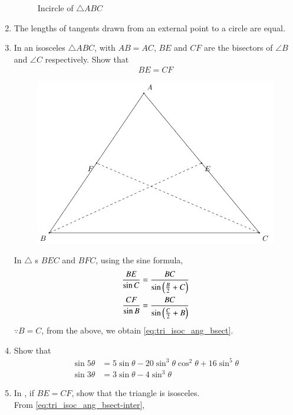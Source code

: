\begin{enumerate}[label=\thesubsection.\arabic*.,ref=\thesubsection.\theenumi]
\begin{figure}[!ht]
\begin{center}
	\end{center}
	\caption{Incircle of $\triangle ABC$}
	\label{fig:tri_icircle}	
\end{figure}
\item The lengths of tangents drawn from an external point to a circle are equal.
\item In an isosceles $\triangle ABC$, with $AB = AC$, $BE$ and $CF$ are the bisectors of $\angle B$ and $\angle C$ respectively.   Show that 
\begin{align}
BE = CF
	\label{eq:tri_isoc_ang_bsect}
\end{align}
\begin{figure}[H]
	\centering
		{\includegraphics[width=0.6\columnwidth]{figs/trig_id/angbis/tri_isoc_ang_bsect.pdf}}
	\caption{}
	\label{fig:tri_isoc_ang_bsect}
\end{figure}
\solution
%
In $\triangle$ s $BEC$ and $BFC$, using the sine formula, 
\begin{align}
	\label{eq:tri_isoc_ang_bsect-inter}
\begin{split}
	\frac{BE}{\sin C}
	&=\frac{BC}{\sin \left(\frac{B}{2}+C\right)}
	\\
	\frac{CF}{\sin B}
	&=\frac{BC}{\sin \left(\frac{C}{2}+B\right)}
\end{split}
\end{align}
$\because B = C$, from the above, we obtain
	\eqref{eq:tri_isoc_ang_bsect}.
\item Show that
\begin{align}
\sin 5\theta &= 5\sin \theta - 20\sin^3 \theta \cos^2 \theta + 16\sin^5 \theta \\
\sin 3\theta &= 3\sin \theta - 4\sin^3 \theta
\label{eq:sin3-5}
\end{align}
\item 
	In , if $BE = CF$, show that the triangle is isosceles.
	\\
	\solution
	From \eqref{eq:tri_isoc_ang_bsect-inter},
\begin{align}

\end{align}
\end{enumerate}

